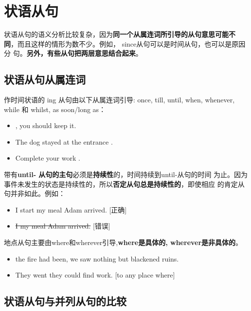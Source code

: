 \chapter{状语从句}

状语从句的语义分析比较复杂，因为\textbf{同一个从属连词所引导的从句意思可能不
  同}，而且这样的情形为数不少。例如， since从句可以是时间从句，也可以是原因分
句。\textbf{另外，有些从句把两层意思结合起来}。

\section{状语从句从属连词}


作时间状语的 ing 从句由以下从属连词引导: once, till, until, when, whenever,
while 和 whilst, as soon/long as：
\begin{itemize}
\item {}, you should keep it.
\item The dog stayed at the entrance .
\item Complete your work .
\end{itemize}

带有\textbf{until- 从句的主句}必须是\textbf{持续性}的，时间持续到until-从句的时间
为止。因为事件未发生的状态是持续性的，所以\textbf{否定从句总是持续性的}，即使相应
的肯定从句并非如此。例如：
\begin{itemize}
\item I  start my meal  Adam arrived. [正确]
\item \sout{I  my meal  Adam arrived.} [错误]
\end{itemize}


地点从句主要由where和wherever引导,\textbf{where是具体的, wherever是非具体的}。
\begin{itemize}
\item {} the fire had been, we saw nothing but blackened ruins.

\item They went  they could find work. [to any place where]
\end{itemize}



\section{状语从句与并列从句的比较}

